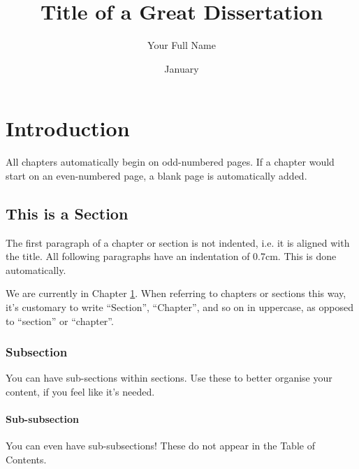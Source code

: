 \documentclass{dissertation}
\title{Title of a Great Dissertation}
\author{Your Full Name}
\date{January}{2026}
\begin{document}
\chapter{Introduction}\label{ch:introduction}
All chapters automatically begin on odd-numbered pages. If a chapter would start on an even-numbered page, a blank page is automatically added.

\section{This is a Section}\label{sec:example_section}
The first paragraph of a chapter or section is not indented, i.e. it is aligned with the title. All following paragraphs have an indentation of 0.7cm. This is done automatically.

We are currently in Chapter \ref{ch:introduction}. When referring to chapters or sections this way, it's customary to write ``Section'', ``Chapter'', and so on in uppercase, as opposed to ``section'' or ``chapter''.

\subsection{Subsection}
You can have sub-sections within sections. Use these to better organise your content, if you feel like it's needed.

\subsubsection{Sub-subsection}
You can even have sub-subsections! These do not appear in the Table of Contents.
\end{document}
